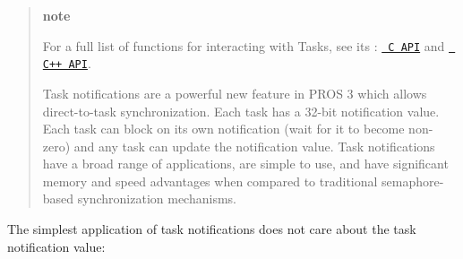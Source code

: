 \begin{quote}
{\bfseries{note}}

For a full list of functions for interacting with Tasks, see its \+: \href{../../api/c/rtos.html}{\texttt{ C A\+PI}} and \href{../../api/cpp/rtos.html}{\texttt{ C++ A\+PI}}.

Task notifications are a powerful new feature in P\+R\+OS 3 which allows direct-\/to-\/task synchronization. Each task has a 32-\/bit notification value. Each task can block on its own notification (wait for it to become non-\/zero) and any task can update the notification value. Task notifications have a broad range of applications, are simple to use, and have significant memory and speed advantages when compared to traditional semaphore-\/based synchronization mechanisms. \end{quote}


The simplest application of task notifications does not care about the task notification value\+: 